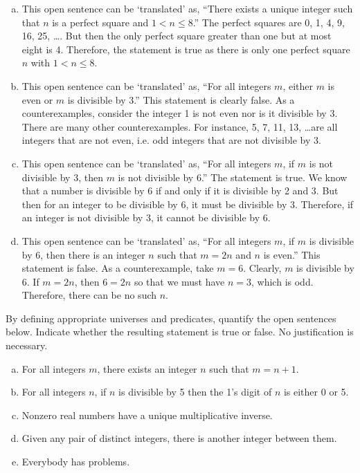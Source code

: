 \documentclass[11pt,letterpaper]{article}
\begin{document}
\sol
\begin{enumerate}[(a)]
\item This open sentence can be `translated' as, ``There exists a unique integer such that $n$ is a perfect square and $1 < n \leq 8$.'' The perfect squares are 0, 1, 4, 9, 16, 25, \ldots. But then the only perfect square greater than one but at most eight is 4. Therefore, the statement is true as there is only one perfect square $n$ with $1 < n \leq 8$. \pspace

\item This open sentence can be `translated' as, ``For all integers $m$, either $m$ is even or $m$ is divisible by 3.'' This statement is clearly false. As a counterexamples, consider the integer 1 is not even nor is it divisible by 3. There are many other counterexamples. For instance, 5, 7, 11, 13, \ldots are all integers that are not even, i.e. odd integers that are not divisible by 3. \pspace


\item This open sentence can be `translated' as, ``For all integers $m$, if $m$ is not divisible by 3, then $m$ is not divisible by 6.'' The statement is true. We know that a number is divisible by 6 if and only if it is divisible by 2 and 3. But then for an integer to be divisible by 6, it must be divisible by 3. Therefore, if an integer is not divisible by 3, it cannot be divisible by 6. \pspace

\item This open sentence can be `translated' as, ``For all integers $m$, if $m$ is divisible by 6, then there is an integer $n$ such that $m= 2n$ and $n$ is even.'' This statement is false. As a counterexample, take $m= 6$. Clearly, $m$ is divisible by 6. If $m= 2n$, then $6= 2n$ so that we must have $n= 3$, which is odd. Therefore, there can be no such $n$. 
\end{enumerate}



\newpage



 By defining appropriate universes and predicates, quantify the open sentences below. Indicate whether the resulting statement is true or false. No justification is necessary. 
	\begin{enumerate}[(a)]
	\item For all integers $m$, there exists an integer $n$ such that $m= n + 1$.
	\item For all integers $n$, if $n$ is divisible by 5 then the 1's digit of $n$ is either 0 or 5.
	\item Nonzero real numbers have a unique multiplicative inverse. 
	\item Given any pair of distinct integers, there is another integer between them.
	\item Everybody has problems. 
	\end{enumerate} \pspace
\end{document}
